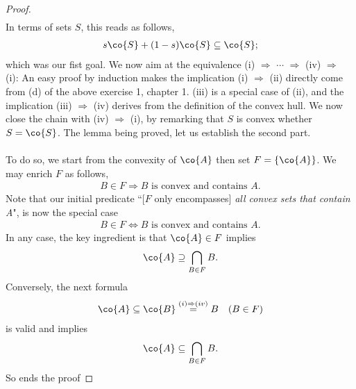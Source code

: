 \begin{proof}
\begin{align}
\end{align}
%
In terms of sets $S$, this reads as follows, %
%
\begin{align}
  s\co{S} + (1-s)\co{S} \subseteq \co{S}; 
\end{align}
%
which was our fist goal. %
We now aim at the equivalence %
%
(i) $\Rightarrow$ $\cdots$ $\Rightarrow$ (iv) $\Rightarrow$ (i): %
%
An easy proof by induction makes the implication (i) $\Rightarrow$ (ii) %
directly come from (d) of the above exercise 1, chapter 1. %
%
(iii) is a special case of (ii),
and the implication (iii) $\Rightarrow$ (iv) derives from the definition of %
the convex hull. %
%
We now close the chain with (iv) $\Rightarrow$ (i), %
by remarking that $S$ is convex whether $S = \co{S}$. %
%  
The lemma being proved, let us establish the second part. \\
\\
To do so, we start from the convexity of $\co{A}$ then set %
%
  $F = \{\co{A}\}$. %
%
We may enrich $F$ as follows,  %
\begin{align}
  B \in F \Rightarrow B \text{ is convex and contains }A.
\end{align}
Note that our initial predicate %
``[$F$ only encompasses] \textit{all convex sets that contain A}", %
is now the special case %
%
\begin{align}
  B \in F \Leftrightarrow B \text{ is convex and contains }A.
\end{align}
%
In any case, the key ingredient is that $\co{A} \in F$ implies %
%
\begin{align}
 \co{A} \supseteq  \bigcap_{B \in F} B.
\end{align}
%
Conversely, the next formula %
%
\begin{align}
  \co{A} \subseteq \co{B} \overset{(i) \Rightarrow (iv)}{=} B \quad (B \in F) 
\end{align}
%
is valid and implies %
\begin{align}
  \co{A} \subseteq \bigcap_{B \in F} B. 
\end{align}
%
So ends the proof
\end{proof}
